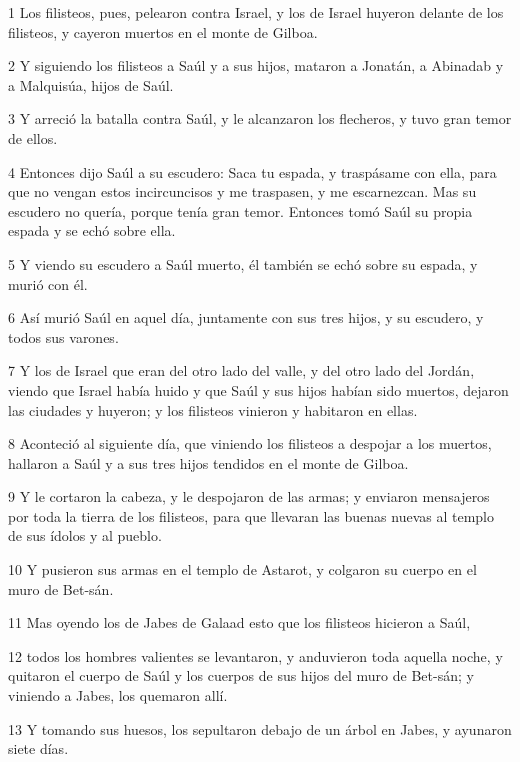 \par 1 Los filisteos, pues, pelearon contra Israel, y los de Israel huyeron delante de los filisteos, y cayeron muertos en el monte de Gilboa.
\par 2 Y siguiendo los filisteos a Saúl y a sus hijos, mataron a Jonatán, a Abinadab y a Malquisúa, hijos de Saúl.
\par 3 Y arreció la batalla contra Saúl, y le alcanzaron los flecheros, y tuvo gran temor de ellos.
\par 4 Entonces dijo Saúl a su escudero: Saca tu espada, y traspásame con ella, para que no vengan estos incircuncisos y me traspasen, y me escarnezcan. Mas su escudero no quería, porque tenía gran temor. Entonces tomó Saúl su propia espada y se echó sobre ella.
\par 5 Y viendo su escudero a Saúl muerto, él también se echó sobre su espada, y murió con él.
\par 6 Así murió Saúl en aquel día, juntamente con sus tres hijos, y su escudero, y todos sus varones.
\par 7 Y los de Israel que eran del otro lado del valle, y del otro lado del Jordán, viendo que Israel había huido y que Saúl y sus hijos habían sido muertos, dejaron las ciudades y huyeron; y los filisteos vinieron y habitaron en ellas.
\par 8 Aconteció al siguiente día, que viniendo los filisteos a despojar a los muertos, hallaron a Saúl y a sus tres hijos tendidos en el monte de Gilboa.
\par 9 Y le cortaron la cabeza, y le despojaron de las armas; y enviaron mensajeros por toda la tierra de los filisteos, para que llevaran las buenas nuevas al templo de sus ídolos y al pueblo.
\par 10 Y pusieron sus armas en el templo de Astarot, y colgaron su cuerpo en el muro de Bet-sán.
\par 11 Mas oyendo los de Jabes de Galaad esto que los filisteos hicieron a Saúl,
\par 12 todos los hombres valientes se levantaron, y anduvieron toda aquella noche, y quitaron el cuerpo de Saúl y los cuerpos de sus hijos del muro de Bet-sán; y viniendo a Jabes, los quemaron allí.
\par 13 Y tomando sus huesos, los sepultaron debajo de un árbol en Jabes, y ayunaron siete días.

